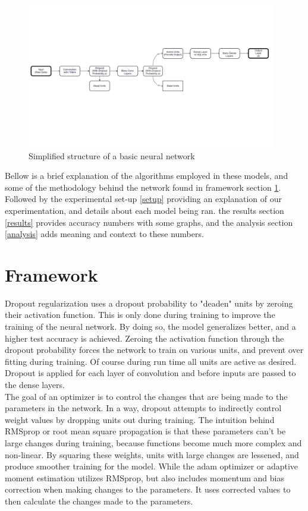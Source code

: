 \documentclass[twocolumn,letterpaper,10pt]{article}
\begin{document}
\begin{figure}[!h]
\begin{center}
\includegraphics[width=.95\linewidth,height=2.5in]{networkDiagram.jpg}
\end{center}
\caption{Simplified structure of a basic neural network}
\label{fig:net}
\end{figure}

Bellow is a brief explanation of the algorithms employed in these models, and some of the methodology behind the network found in framework section \ref{frame}. Followed by the experimental set-up \ref{setup} providing an explanation of our experimentation, and details about each model being ran. the results section \ref{results} provides accuracy numbers with some graphs, and the analysis section \ref{analysis} adds meaning and context to these numbers.\\ 


\section{Framework}
\label{frame} 
Dropout regularization uses a dropout probability to "deaden" units by zeroing their activation function. This is only done during training to improve the training of the neural network. By doing so, the model generalizes better, and a higher test accuracy is achieved. Zeroing the activation function through the dropout probability forces the network to train on various units, and prevent over fitting during training. Of course during run time all units are active as desired. Dropout is applied for each layer of convolution and before inputs are passed to the dense layers.\\

The goal of an optimizer is to control the changes that are being made to the parameters in the network. In a way, dropout attempts to indirectly control weight values by dropping units out during training. The intuition behind RMSprop or root mean square propagation is that these parameters can't be large changes during training, because functions become much more complex and non-linear. By squaring these weights, units with large changes are lessened, and produce smoother training for the model. While the adam optimizer or adaptive moment estimation utilizes RMSprop, but also includes momentum and bias correction when making changes to the parameters. It uses corrected values to then calculate the changes made to the parameters.\\
\end{document}
